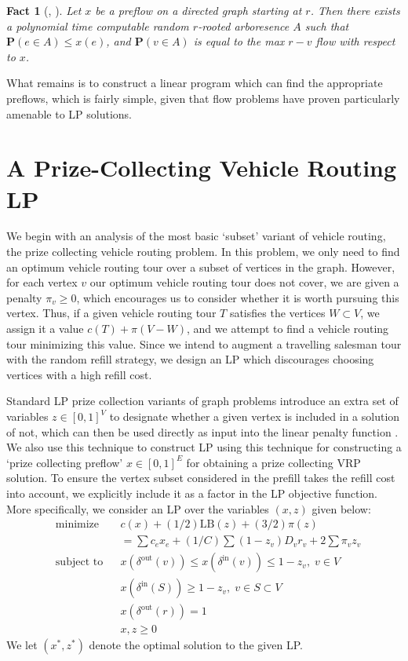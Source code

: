 \documentclass{article}
\theoremstyle{plain}
\newtheorem*{fact}{Fact}
\theoremstyle{plain}
\begin{document}
\begin{fact}[\cite{FlowToTreeResult}, \cite{FlowToTreePolyTimeResult}]
    Let $x$ be a preflow on a directed graph starting at $r$. Then there exists a polynomial time computable random $r$-rooted arboresence $A$ such that $\mathbf{P}(e \in A) \leq x(e)$, and $\mathbf{P}(v \in A)$ is equal to the max $r-v$ flow with respect to $x$.
\end{fact}

What remains is to construct a linear program which can find the appropriate preflows, which is fairly simple, given that flow problems have proven particularly amenable to LP solutions.

\section{A Prize-Collecting Vehicle Routing LP}

We begin with an analysis of the most basic `subset' variant of vehicle routing, the prize collecting vehicle routing problem. In this problem, we only need to find an optimum vehicle routing tour over a subset of vertices in the graph. However, for each vertex $v$ our optimum vehicle routing tour does not cover, we are given a penalty $\pi_v \geq 0$, which encourages us to consider whether it is worth pursuing this vertex. Thus, if a given vehicle routing tour $T$ satisfies the vertices $W \subset V$, we assign it a value $c(T) + \pi(V - W)$, and we attempt to find a vehicle routing tour minimizing this value. Since we intend to augment a travelling salesman tour with the random refill strategy, we design an LP which discourages choosing vertices with a high refill cost.

Standard LP prize collection variants of graph problems introduce an extra set of variables $z \in [0,1]^V$ to designate whether a given vertex is included in a solution of not, which can then be used directly as input into the linear penalty function \cite{MSTLPApprox}. We also use this technique to construct LP using this technique for constructing a `prize collecting preflow' $x \in [0,1]^E$ for obtaining a prize collecting VRP solution. To ensure the vertex subset considered in the prefill takes the refill cost into account, we explicitly include it as a factor in the LP objective function. More specifically, we consider an LP over the variables $(x,z)$ given below:
%
\begin{equation*}
\begin{aligned}
& \text{minimize}
& & c(x) + (1/2) \text{LB}(z) + (3/2) \pi(z)\\
& & & = \sum c_ex_e + (1/C) \sum (1 - z_v) D_vr_v + 2\sum \pi_v z_v \\
& \text{subject to} & & x(\delta^{\text{out}}(v)) \leq x(\delta^{\text{in}}(v)) \leq 1 - z_v, \; v \in V\\
& & & x(\delta^{\text{in}}(S)) \geq 1 - z_v, \; v \in S \subset V\\
& & & x(\delta^{\text{out}}(r)) = 1\\
& & & x,z \geq 0
\end{aligned}
\end{equation*}
%
We let $(x^*,z^*)$ denote the optimal solution to the given LP.
\end{document}
